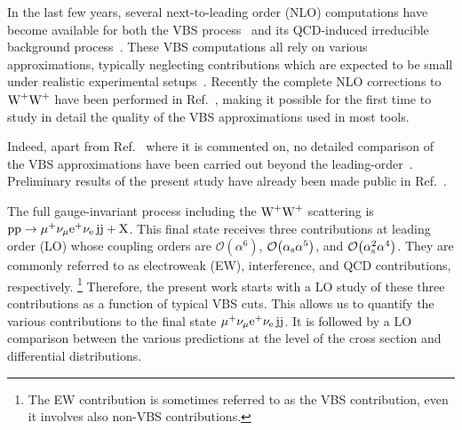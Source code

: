 In the last few years, several next-to-leading order (NLO) computations have become available for both the VBS process~\cite{Jager:2006zc,Jager:2006cp,Bozzi:2007ur,Jager:2009xx,Jager:2011ms,Denner:2012dz,Rauch:2016pai} and its QCD-induced irreducible background process~\cite{Rauch:2016pai,Melia:2010bm,Melia:2011gk,Campanario:2013gea,Baglio:2014uba}.
These VBS computations all rely on various approximations, typically neglecting contributions which are expected to be small under realistic experimental setups~\cite{Oleari:2003tc}. Recently the complete NLO corrections to $\text{W}^+\text{W}^+$ have been performed in Ref.~\cite{Biedermann:2017bss}, making it possible for the first time to study in detail the quality of the VBS approximations used in most tools. 

Indeed, apart from Ref.~\cite{Biedermann:2017bss} where it is commented on,  no detailed comparison of the VBS approximations have been carried out beyond the leading-order~\cite{Oleari:2003tc}. Preliminary results of the present study have already been made public in Ref.~\cite{Anders:2018gfr}.

The full gauge-invariant process including the $\text{W}^+\text{W}^+$ scattering 
 is $\text{p}\text{p}\to\mu^+\nu_\mu{\rm e}^+\nu_{\rm e}\,\text{j}\text{j}+\mathrm{X}$.
This final state receives three contributions at leading order (LO) whose coupling orders are $\mathcal{O}{\left(\alpha^{6}\right)}$, $\mathcal{O}{\left(\alpha_{\rm s}\alpha^{5}\right)}$, and $\mathcal{O}{\left(\alpha_\text{s}^{2}\alpha^{4}\right)}$.
They are commonly referred to as electroweak (EW), interference, and QCD contributions, respectively.%
\footnote{The EW contribution is sometimes referred to as the VBS contribution, even it involves also non-VBS contributions.}
Therefore, the present work starts with a LO study of these three contributions as a function of typical VBS cuts.
This allows us to quantify the various contributions to the final state $\mu^+\nu_\mu{\rm e}^+\nu_{\rm e}\,\text{j}\text{j}$.
It is followed by a LO comparison between the various predictions at the level of the cross section and differential distributions.

